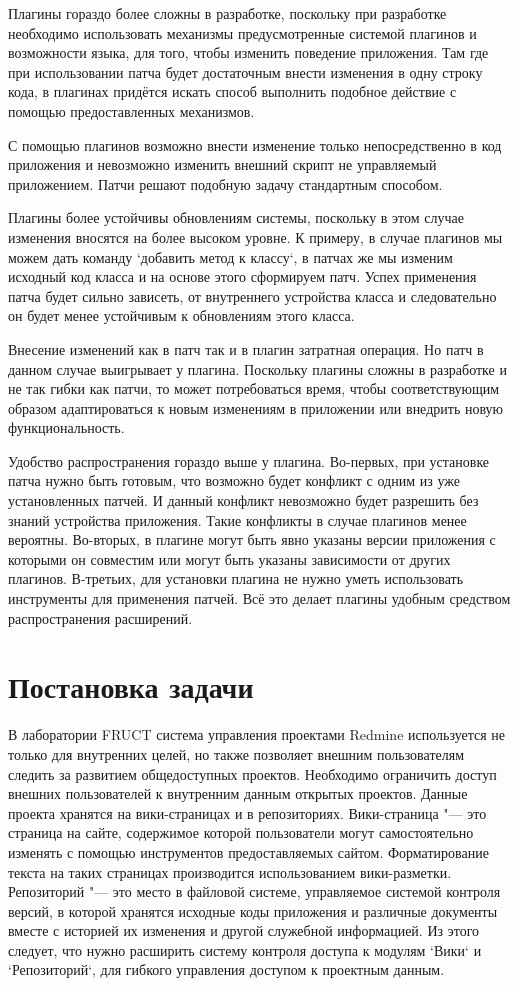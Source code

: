 Плагины гораздо более сложны в разработке, поскольку при разработке необходимо
использовать механизмы предусмотренные системой плагинов и возможности языка,
для того, чтобы изменить поведение приложения. Там где при
использовании патча будет достаточным внести изменения в одну строку кода, в
плагинах придётся искать способ выполнить подобное действие с помощью
предоставленных механизмов.

С помощью плагинов возможно внести изменение только непосредственно в код
приложения и невозможно изменить внешний скрипт не управляемый приложением.
Патчи решают подобную задачу стандартным способом.

Плагины более устойчивы обновлениям системы, поскольку в этом случае изменения
вносятся на более высоком уровне. К примеру, в случае плагинов мы можем дать
команду `добавить метод к классу`, в патчах же мы изменим исходный код класса и
на основе этого сформируем патч. Успех применения патча будет сильно зависеть,
от внутреннего устройства класса и следовательно он будет менее устойчивым к
обновлениям этого класса.

Внесение изменений как в патч так и в плагин затратная операция. Но патч в
данном случае выигрывает у плагина. Поскольку плагины сложны в разработке и не
так гибки как патчи, то может потребоваться время, чтобы соответствующим
образом адаптироваться к новым изменениям в приложении или внедрить новую
функциональность.

Удобство распространения гораздо выше у плагина. Во-первых, при установке патча
нужно быть готовым, что возможно будет конфликт с одним из уже установленных
патчей. И данный конфликт невозможно будет разрешить без знаний устройства
приложения.
Такие конфликты в случае плагинов менее вероятны. Во-вторых, в плагине могут
быть явно указаны версии приложения с которыми он совместим или могут быть
указаны зависимости от других плагинов. В-третьих, для установки плагина не
нужно уметь использовать инструменты для применения патчей. Всё это делает
плагины удобным средством распространения расширений.


\section{Постановка задачи}
В лаборатории FRUCT система управления проектами Redmine используется не только
для внутренних целей, но также позволяет внешним пользователям следить за
развитием общедоступных проектов. Необходимо ограничить доступ внешних
пользователей к внутренним данным открытых проектов. Данные проекта хранятся на
вики-страницах и в репозиториях. Вики-страница "--- это страница на сайте,
содержимое которой пользователи могут самостоятельно изменять с помощью
инструментов предоставляемых сайтом. Форматирование текста на таких страницах
производится использованием вики-разметки. Репозиторий "--- это место в
файловой системе, управляемое системой контроля версий, в которой хранятся
исходные коды приложения и различные документы вместе с историей их изменения и
другой служебной информацией. Из этого следует, что нужно расширить систему
контроля доступа к модулям `Вики` и `Репозиторий`, для гибкого управления
доступом к проектным данным.
   

